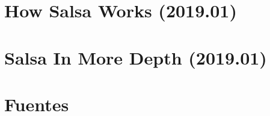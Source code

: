 \documentclass[12pt, a4paper]{report}
\begin{document}
\section*{How Salsa Works (2019.01)}
\cite{niko2019salsaworks}

\section*{Salsa In More Depth (2019.01)}
\cite{niko2019salsadepth}

\section*{Fuentes}
\end{document}
